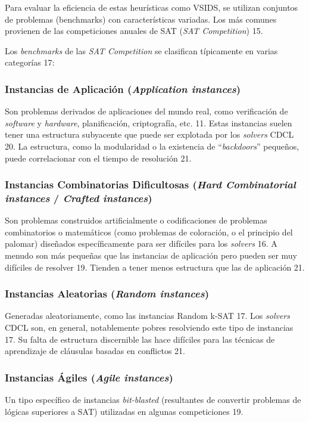 Para evaluar la eficiencia de estas heurísticas como VSIDS, se utilizan conjuntos de problemas (benchmarks) con características variadas. Los más comunes provienen de las competiciones anuales de SAT (\textit{SAT Competition}) 15.

Los \textit{benchmarks} de las \textit{SAT Competition} se clasifican típicamente en varias categorías 17:

\subsubsection{Instancias de Aplicación (\textit{Application instances})}
Son problemas derivados de aplicaciones del mundo real, como verificación de \textit{software} y \textit{hardware}, planificación, criptografía, etc. 11. Estas instancias suelen tener una estructura subyacente que puede ser explotada por los \textit{solvers} CDCL 20. La estructura, como la modularidad o la existencia de ``\textit{backdoors}'' pequeños, puede correlacionar con el tiempo de resolución 21.

\subsubsection{Instancias Combinatorias Dificultosas (\textit{Hard Combinatorial instances} / \textit{Crafted instances})}
Son problemas construidos artificialmente o codificaciones de problemas combinatorios o matemáticos (como problemas de coloración, o el principio del palomar) diseñados específicamente para ser difíciles para los \textit{solvers} 16. A menudo son más pequeñas que las instancias de aplicación pero pueden ser muy difíciles de resolver 19. Tienden a tener menos estructura que las de aplicación 21.

\subsubsection{Instancias Aleatorias (\textit{Random instances})}
Generadas aleatoriamente, como las instancias Random k-SAT 17. Los \textit{solvers} CDCL son, en general, notablemente pobres resolviendo este tipo de instancias 17. Su falta de estructura discernible las hace difíciles para las técnicas de aprendizaje de cláusulas basadas en conflictos 21.

\subsubsection{Instancias Ágiles (\textit{Agile instances})}
Un tipo específico de instancias \textit{bit-blasted} (resultantes de convertir problemas de lógicas superiores a SAT) utilizadas en algunas competiciones 19. 

